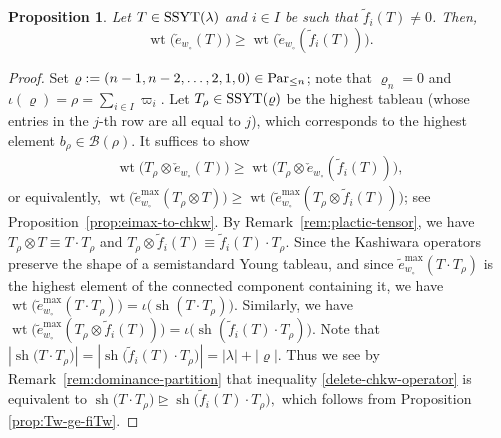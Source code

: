 \documentclass[reqno]{amsart}
\newtheorem{proposition}[theorem]{Proposition}
\theoremstyle{definition}
\theoremstyle{remark}
\numberwithin{equation}{section}
\newcommand{\B}{\mathcal{B}}
\newcommand{\wt}{\operatorname{wt}}
\newcommand{\te}{\tilde e}
\newcommand{\tf}{\tilde f}
\newcommand{\chke}{\check e}
\newcommand{\dom}{\trianglerighteq}
\newcommand{\shape}{\operatorname{sh}}
\begin{document}
	\begin{proposition}\label{prop:w0Tgew0fiT}
		Let $T\in \operatorname{SSYT}(\lambda)$ and $i\in I$ be such that $\tf_i(T)\ne0$.
		Then,
		\[
		\wt\bigl(\chke_{w_\circ}(T)\bigr)\ge\wt\bigl(\chke_{w_\circ}(\tf_i(T))\bigr).
		\]
	\end{proposition}
	\begin{proof}
		Set $\varrho:=(n-1,n-2,\dots,2,1,0)\in\mathrm{Par}_{\le n}$; note that $\varrho_n=0$ and $\iota(\varrho)=\rho=\sum_{i\in I}\varpi_i$.
		Let $T_\rho\in\operatorname{SSYT}(\varrho)$ be the highest tableau (whose entries in the $j$-th row are all equal to $j$),
		which corresponds to the highest element $b_\rho\in\B(\rho)$.
		It suffices to show
		\begin{align}\label{delete-chkw-operator}
			\wt\bigl(T_\rho\otimes\chke_{w_\circ}(T)\bigr)\ge\wt\bigl(T_\rho\otimes\chke_{w_\circ}(\tf_i(T))\bigr),
		\end{align}
		or equivalently,
		$\wt\bigl(\te_{w_\circ}^{\max}(T_\rho\otimes T)\bigr)\ge\wt\bigl(\te_{w_\circ}^{\max}(T_\rho\otimes\tf_i(T))\bigr)$;
		see Proposition~\ref{prop:eimax-to-chkw}.
		By Remark~\ref{rem:plactic-tensor},
		we have $T_\rho\otimes T\equiv T\cdot T_\rho$
		and $T_\rho\otimes\tf_i(T)\equiv\tf_i(T)\cdot T_\rho$.
		Since the Kashiwara operators preserve the shape of a semistandard Young tableau, and since
		$\te_{w_\circ}^{\max}(T\cdot T_\rho)$ is the highest element of the connected
		component containing it, we have
		$
		\wt\bigl(\te_{w_\circ}^{\max}(T\cdot T_\rho)\bigr)=\iota\bigl(\shape(T\cdot T_\rho)\bigr).
		$
		Similarly,
		we have $\wt\bigl(\te_{w_\circ}^{\max}(T_\rho\otimes\tf_i(T))\bigr)=\iota\bigl(\shape(\tf_i(T)\cdot T_\rho)\bigr)$.
		Note that $|\shape\bigl(T\cdot T_\rho\bigr)|=|\shape\bigl(\tf_i(T)\cdot T_\rho\bigr)|=|\lambda|+|\varrho|$.
		Thus we see by Remark~\ref{rem:dominance-partition} that inequality \eqref{delete-chkw-operator} is equivalent to
		$
		\shape\bigl(T\cdot T_\rho\bigr)\dom\shape\bigl(\tf_i(T)\cdot T_\rho\bigr),
		$
		which follows from Proposition \ref{prop:Tw-ge-fiTw}.
	\end{proof}
	
\end{document}
